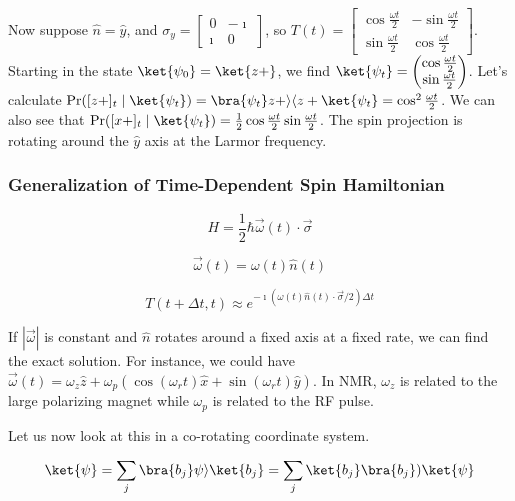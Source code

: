 \documentclass[a4paper,twoside,master.tex]{subfiles}
\begin{document}
Now suppose $\hat{n}=\hat{y}$, and
$\sigma_y = \begin{bmatrix}0&-\imath\\\imath&0\end{bmatrix}$, so
$T(t) = \begin{bmatrix}\cos\frac{\omega t}{2}&-\sin\frac{\omega t}{2}\\\sin\frac{\omega t}{2}&\cos\frac{\omega t}{2}\end{bmatrix}$.
Starting in the state $\ket{\psi_0} = \ket{z+}$, we find
$\ket{\psi_t} = \begin{pmatrix}\cos\frac{\omega t}{2}\\\sin\frac{\omega t}{2}\end{pmatrix}$.
Let's calculate
$\Pr([z+]_t\mid\ket{\psi_t}) = \bra{\psi_t}z+\rangle\langle z+\ket{\psi_t} = \cos^2\frac{\omega t}{2}$.
We can also see that
$\Pr([x+]_t\mid\ket{\psi_t}) = \frac{1}{2}\cos\frac{\omega t}{2}\sin\frac{\omega t}{2}$.
The spin projection is rotating around the $\hat{y}$ axis at the
Larmor frequency.



\hypertarget{header-n365}{%
\subsubsection{Generalization of Time-Dependent Spin
Hamiltonian}\label{header-n365}}

\begin{equation}
H=\frac{1}{2}\hbar\vec{\omega}(t)\cdot\vec{\sigma}
\end{equation}

\begin{equation}
\vec{\omega}(t) = \omega(t)\hat{n}(t)
\end{equation}

\begin{equation}
T(t+\Delta t, t)\approx e^{-\imath(\omega(t)\hat{n}(t)\cdot\vec{\sigma}/2)\Delta t}
\end{equation}

If $|\vec{\omega}|$ is constant and $\hat{n}$ rotates around a fixed
axis at a fixed rate, we can find the exact solution. For instance, we
could have
$\vec{\omega}(t) = \omega_z\hat{z} + \omega_{p}(\cos(\omega_r t)\hat{x} + \sin(\omega_r t)\hat{y})$.
In NMR, $\omega_z$ is related to the large polarizing magnet while
$\omega_p$ is related to the RF pulse.

Let us now look at this in a co-rotating coordinate system.

\begin{equation}
\ket{\psi} = \sum_j\bra{ b_j } \psi\rangle\ket{b_j} = \sum_j \ket{b_j}\bra{ b_j})\ket{\psi}
\end{equation}
\end{document}
